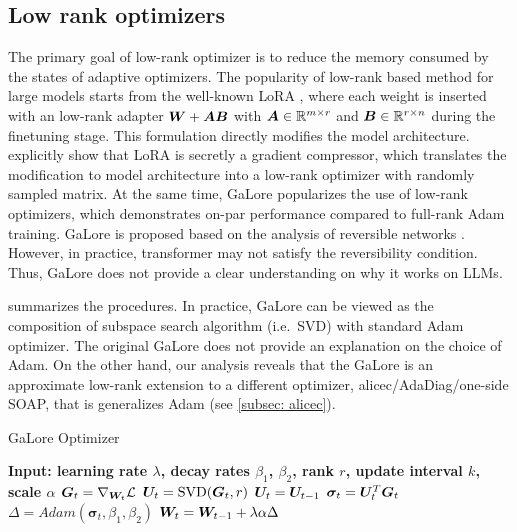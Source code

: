 \subsection{Low rank optimizers}
\label{subapp: Low rank optimizers}
The primary goal of low-rank optimizer is to reduce the memory consumed by the states of adaptive optimizers. The popularity of low-rank based method for large models starts from the well-known LoRA \citep{hu2021lora}, where each weight is inserted with an low-rank adapter ${\bm{W}}+{\bm{A}}{\bm{B}}$ with ${\bm{A}} \in \mathbb{R}^{m\times r}$ and ${\bm{B}}\in \mathbb{R}^{r\times n}$ during the finetuning stage. This formulation directly modifies the model architecture. \cite{si2024flora} explicitly show that LoRA is secretly a gradient compressor, which translates the modification to model architecture into a low-rank optimizer with randomly sampled matrix. At the same time, GaLore \citep{zhao2024galore} popularizes the use of low-rank optimizers, which demonstrates on-par performance compared to full-rank Adam training. GaLore is proposed based on the analysis of reversible networks \citep{tian2020understanding}. However, in practice, transformer may not satisfy the reversibility condition. Thus, GaLore does not provide a clear understanding on why it works on LLMs. 

 summarizes the procedures. In practice, GaLore can be viewed as the composition of subspace search algorithm (i.e.~SVD) with standard Adam optimizer. The original GaLore does not provide an explanation on the choice of Adam. On the other hand, our analysis reveals that the GaLore is an approximate low-rank extension to a different optimizer, \gls{alicec}/AdaDiag/one-side SOAP, that is generalizes Adam (see \cref{subsec: alicec}). 

\begin{algorithm}
    \caption{GaLore Optimizer}
    \label{alg: GaLore optimizer}
    \begin{algorithmic}
        \STATE \bfseries{Input:} learning rate $\lambda$, decay rates $\beta_1$, $\beta_2$, rank $r$, update interval $k$, scale $\alpha$
        \STATE ${\bm{G}}_t=\nabla_{{\bm{W}}_t}\mathcal{L}$
            \STATE ${\bm{U}}_t=\operatorname{SVD}({\bm{G}}_t, r)$
        \ELSE
            \STATE ${\bm{U}}_t={\bm{U}}_{t-1}$
        \ENDIF
        \STATE $\bm{\sigma}_t={\bm{U}}_t^T{\bm{G}}_t$
        \STATE $\Delta = Adam(\bm{\sigma}_t, \beta_1,\beta_2)$
        \STATE ${\bm{W}}_t = {\bm{W}}_{t-1} + \lambda\alpha\Delta$
        \ENDFOR
    \end{algorithmic}
\end{algorithm}

